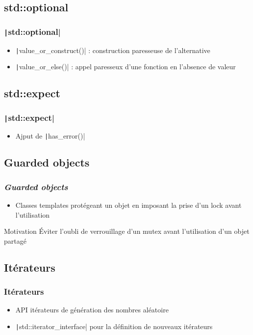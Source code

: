 \documentclass[C++.tex]{subfiles}
\begin{document}
\subsection*{std::optional}
\begin{frame}[fragile]
	\frametitle{\texttt|std::optional|}
	\begin{itemize}
		\item \texttt|value_or_construct()| : construction paresseuse de l'alternative
		\item \texttt|value_or_else()| : appel paresseux d'une fonction en l'absence de valeur
	\end{itemize}

\end{frame}

\subsection*{std::expect}
\begin{frame}[fragile]
	\frametitle{\texttt|std::expect|}
	\begin{itemize}
		\item Ajput de \texttt|has_error()|
	\end{itemize}

\end{frame}

\subsection*{Guarded objects}
\begin{frame}[fragile]
	\frametitle{\textit{Guarded objects}}
	\begin{itemize}
		\item Classes templates protégeant un objet en imposant la prise d'un lock avant l'utilisation
	\end{itemize}

	\begin{block}{Motivation}
		Éviter l'oubli de verrouillage d'un mutex avant l'utilisation d'un objet partagé
	\end{block}

\end{frame}

\subsection*{Itérateurs}
\begin{frame}[fragile]
	\frametitle{Itérateurs}
	\begin{itemize}
		\item API \og itérateurs\fg{} de génération des nombres aléatoire
		\item \texttt|std::iterator_interface| pour la définition de nouveaux itérateurs
	\end{itemize}

\end{frame}
\end{document}
